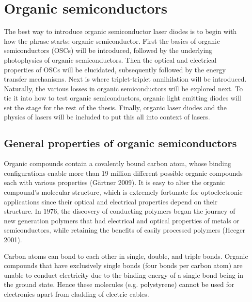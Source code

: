 \documentclass[
  letterpaper,
  DIV=11,
  numbers=noendperiod,
  oneside]{scrreprt}
\begin{document}
\hypertarget{organic-semiconductors}{%
\section[Organic
semiconductors]{\texorpdfstring{\protect\hypertarget{sec:level2}{}{}Organic
semiconductors}{Organic semiconductors}}\label{organic-semiconductors}}

The best way to introduce organic semiconductor laser diodes is to begin
with how the phrase starts: organic semiconductor. First the basics of
organic semiconductors (OSCs) will be introduced, followed by the
underlying photophysics of organic semiconductors. Then the optical and
electrical properties of OSCs will be elucidated, subsequently followed
by the energy transfer mechanisms. Next is where triplet-triplet
annihilation will be introduced. Naturally, the various losses in
organic semiconductors will be explored next. To tie it into how to test
organic semiconductors, organic light emitting diodes will set the stage
for the rest of the thesis. Finally, organic laser diodes and the
physics of lasers will be included to put this all into context of
lasers.

\hypertarget{general-properties-of-organic-semiconductors}{%
\subsection{General properties of organic
semiconductors}\label{general-properties-of-organic-semiconductors}}

Organic compounds contain a covalently bound carbon atom, whose binding
configurations enable more than 19 million different possible organic
compounds each with various properties (Gärtner 2009). It is easy to
alter the organic compound's molecular structure, which is extremely
fortunate for optoelectronic applications since their optical and
electrical properties depend on their structure. In 1976, the discovery
of conducting polymers began the journey of new generation polymers that
had electrical and optical properties of metals or semiconductors, while
retaining the benefits of easily processed polymers (Heeger 2001).

Carbon atoms can bond to each other in single, double, and triple bonds.
Organic compounds that have exclusively single bonds (four bonds per
carbon atom) are unable to conduct electricity due to the binding energy
of a single bond being in the ground state. Hence these molecules (e.g.
polystyrene) cannot be used for electronics apart from cladding of
electric cables.
\end{document}

